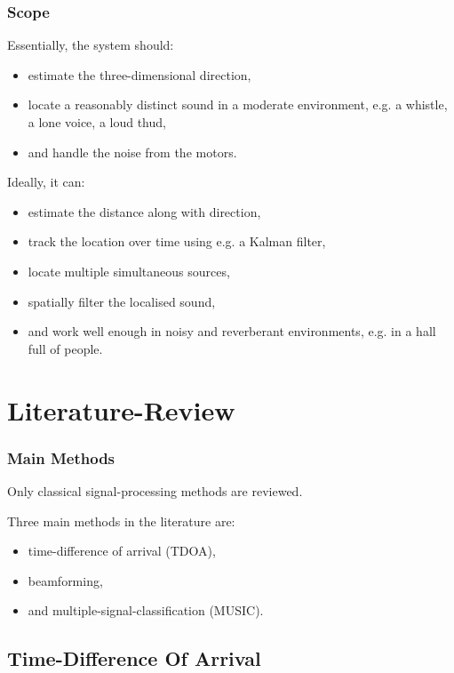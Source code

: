 \documentclass{beamer}
\begin{document}
\begin{frame}
\frametitle{Scope}

Essentially, the system should:
\begin{itemize}
	\item estimate the three-dimensional direction,
	\item locate a reasonably distinct sound in a moderate environment, e.g. a whistle, a lone voice, a loud thud,
	\item and handle the noise from the motors.
\end{itemize}
Ideally, it can:
\begin{itemize}
	\item estimate the distance along with direction,
	\item track the location over time using e.g. a Kalman filter,
	\item locate multiple simultaneous sources,
	\item spatially filter the localised sound,
	\item and work well enough in noisy and reverberant environments, e.g. in a hall full of people.
\end{itemize}

\end{frame}

\section{Literature-Review}

\begin{frame}
\frametitle{Main Methods}
Only classical signal-processing methods are reviewed.

Three main methods in the literature are:
\begin{itemize}
	\item time-difference of arrival (TDOA),
	\item beamforming,
	\item and multiple-signal-classification (MUSIC).
\end{itemize}

\end{frame}

\subsection{Time-Difference Of Arrival}
\end{document}
